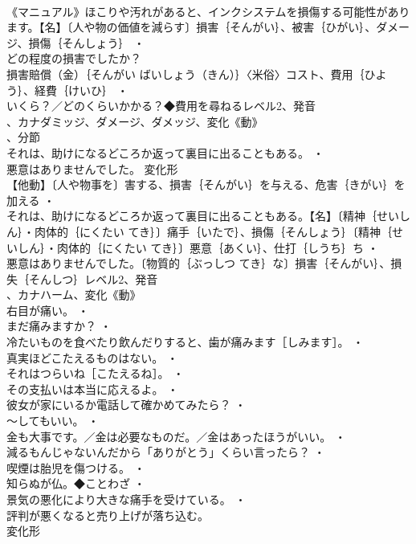 \documentclass[8pt]{extreport}
\begin{document}
\begin{CJK}{UTF8}{min}
\\	《マニュアル》ほこりや汚れがあると、インクシステムを損傷する可能性があります。【名】〔人や物の価値を減らす〕損害｛そんがい｝、被害｛ひがい｝、ダメージ、損傷｛そんしょう｝ ・
\\	どの程度の損害でしたか？
\\	損害賠償（金）｛そんがい ばいしょう（きん）｝〈米俗〉コスト、費用｛ひよう｝、経費｛けいひ｝ ・
\\	いくら？／どのくらいかかる？◆費用を尋ねるレベル2、発音
\\	、カナダミッジ、ダメージ、ダメッジ、変化《動》
\\	、分節
\\	それは、助けになるどころか返って裏目に出ることもある。 ・
\\	悪意はありませんでした。	変化形 
\\	【他動】〔人や物事を〕害する、損害｛そんがい｝を与える、危害｛きがい｝を加える ・
\\	それは、助けになるどころか返って裏目に出ることもある。【名】〔精神｛せいしん｝・肉体的｛にくたい てき｝〕痛手｛いたで｝、損傷｛そんしょう｝〔精神｛せいしん｝・肉体的｛にくたい てき｝〕悪意｛あくい｝、仕打｛しうち｝ち ・
\\	悪意はありませんでした。〔物質的｛ぶっしつ てき｝な〕損害｛そんがい｝、損失｛そんしつ｝レベル2、発音
\\	、カナハーム、変化《動》
\\	右目が痛い。 ・
\\	まだ痛みますか？ ・
\\	冷たいものを食べたり飲んだりすると、歯が痛みます［しみます］。 ・
\\	真実ほどこたえるものはない。 ・
\\	それはつらいね［こたえるね］。 ・
\\	その支払いは本当に応えるよ。 ・
\\	彼女が家にいるか電話して確かめてみたら？ ・
\\	～してもいい。 ・
\\	金も大事です。／金は必要なものだ。／金はあったほうがいい。 ・
\\	減るもんじゃないんだから「ありがとう」くらい言ったら？ ・
\\	喫煙は胎児を傷つける。 ・
\\	知らぬが仏。◆ことわざ ・
\\	景気の悪化により大きな痛手を受けている。 ・
\\	評判が悪くなると売り上げが落ち込む。
\\	変化形 

\end{CJK}
\end{document}
